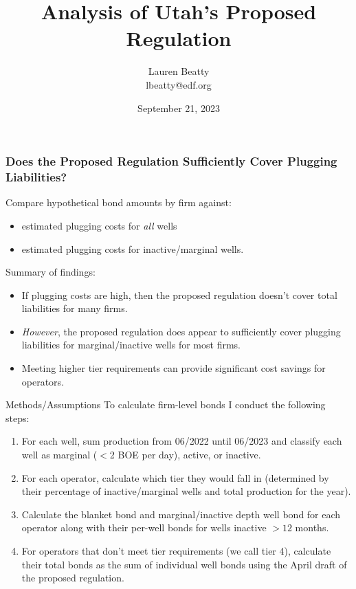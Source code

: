 \documentclass{beamer}
\title{Analysis of Utah's Proposed Regulation}
\author{Lauren Beatty\\ lbeatty@edf.org}
\institute{Environmental Defense Fund}
\date{September 21, 2023}
\begin{document}
\frame{\titlepage}

\begin{frame}
\frametitle{Does the Proposed Regulation Sufficiently Cover Plugging Liabilities?}
    Compare hypothetical bond amounts by firm against:
    \begin{itemize}
        \item estimated plugging costs for \textit{all} wells
        \item estimated plugging costs for inactive/marginal wells.
    \end{itemize}
    Summary of findings:
    \begin{itemize}
        \item If plugging costs are high, then the proposed regulation doesn't cover total liabilities for many firms.
        \item \textit{However}, the proposed regulation does appear to sufficiently cover plugging liabilities for marginal/inactive wells for most firms.
        \item Meeting higher tier requirements can provide significant cost savings for operators.
    \end{itemize}
\end{frame}

\begin{frame}{Methods/Assumptions}
\label{BondCalc}
\vspace{-0.2cm}
To calculate firm-level bonds I conduct the following steps:
\begin{enumerate}
    \item For each well, sum production from 06/2022 until 06/2023 and classify each well as marginal ($<$2 BOE per day), active, or inactive.
    \item For each operator, calculate which tier they would fall in (determined by their percentage of inactive/marginal wells and total production for the year).
    \item Calculate the blanket bond and marginal/inactive depth well bond for each operator along with their per-well bonds for wells inactive $>12$ months.
    \item For operators that don't meet tier requirements (we call tier 4), calculate their total bonds as the sum of individual well bonds using the April draft of the proposed regulation.
\end{enumerate}
\hyperlink{bondingnumbers}{}
\end{frame}
\end{document}
